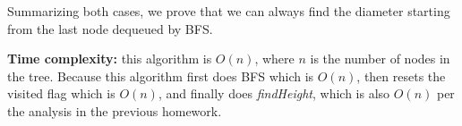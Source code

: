 \documentclass{article}
\begin{document}
\begin{description}
  Summarizing both cases, we prove that we can always find the diameter starting from the last node dequeued by BFS.

  \textbf{Time complexity:} this algorithm is $O(n)$, where $n$ is the number of nodes in the tree. Because this algorithm first does BFS which is $O(n)$, then resets the visited flag which is $O(n)$, and finally does \textit{findHeight}, which is also $O(n)$ per the analysis in the previous homework.

\end{description}
\end{document}
